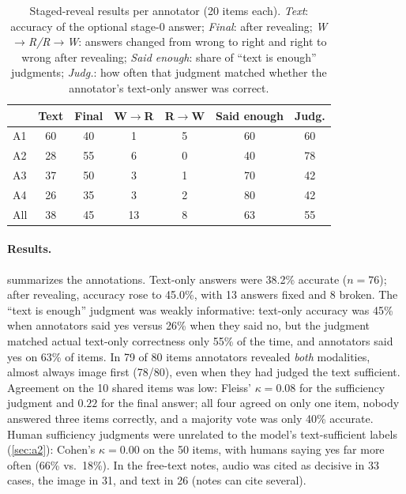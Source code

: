 \documentclass{article}
\begin{document}
\begin{table}[t]
\caption{Staged-reveal results per annotator (20 items each). \emph{Text}: accuracy of the optional stage-0
answer; \emph{Final}: after revealing; \emph{W$\to$R/R$\to$W}: answers changed from wrong to right and
right to wrong after revealing; \emph{Said enough}: share of ``text is enough'' judgments; \emph{Judg.}:
how often that judgment matched whether the annotator's text-only answer was correct.}
\label{tab:annotators}
\centering\small
\setlength{\tabcolsep}{3.5pt}
\begin{tabular}{lcccccc}
\toprule
 & Text & Final & W$\to$R & R$\to$W & Said enough & Judg. \\
\midrule
A1 & 60 & 40 & 1 & 5 & 60 & 60 \\
A2 & 28 & 55 & 6 & 0 & 40 & 78 \\
A3 & 37 & 50 & 3 & 1 & 70 & 42 \\
A4 & 26 & 35 & 3 & 2 & 80 & 42 \\
\midrule
All & 38 & 45 & 13 & 8 & 63 & 55 \\
\bottomrule
\end{tabular}
\end{table}

\paragraph{Results.}  summarizes the annotations.
Text-only answers were 38.2\% accurate ($n{=}76$); after revealing, accuracy
rose to 45.0\%, with 13 answers fixed and 8 broken. The ``text is enough''
judgment was weakly informative: text-only accuracy was 45\% when annotators said
yes versus 26\% when they said no, but the judgment matched actual text-only
correctness only 55\% of the time, and annotators said yes on 63\% of items. In
79 of 80 items annotators revealed \emph{both} modalities, almost always image
first (78/80), even when they had judged the text sufficient. Agreement on the
10 shared items was low: Fleiss' $\kappa{=}0.08$ for the sufficiency judgment and
$0.22$ for the final answer; all four agreed on only one item, nobody answered
three items correctly, and a majority vote was only 40\% accurate. Human
sufficiency judgments were unrelated to the model's text-sufficient labels
(\cref{sec:a2}): Cohen's $\kappa{=}0.00$ on the 50 items, with humans saying yes
far more often (66\% vs.\ 18\%). In the free-text notes, audio was cited as
decisive in 33 cases, the image in 31, and text in 26 (notes can cite several).
\end{document}
